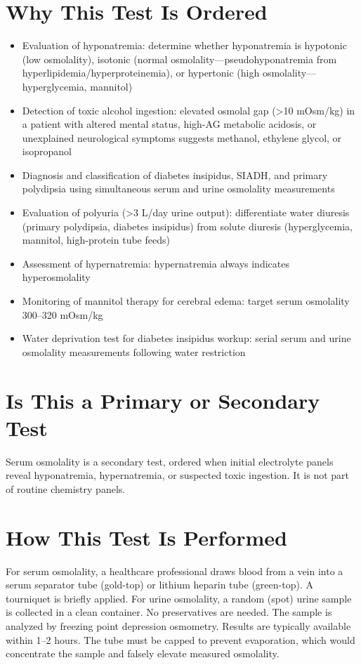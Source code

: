 \section*{Why This Test Is Ordered}
\begin{itemize}
  \item Evaluation of hyponatremia: determine whether hyponatremia is hypotonic (low osmolality), isotonic (normal osmolality---pseudohyponatremia from hyperlipidemia/hyperproteinemia), or hypertonic (high osmolality---hyperglycemia, mannitol)
  \item Detection of toxic alcohol ingestion: elevated osmolal gap (>10 mOsm/kg) in a patient with altered mental status, high-AG metabolic acidosis, or unexplained neurological symptoms suggests methanol, ethylene glycol, or isopropanol
  \item Diagnosis and classification of diabetes insipidus, SIADH, and primary polydipsia using simultaneous serum and urine osmolality measurements
  \item Evaluation of polyuria (>3 L/day urine output): differentiate water diuresis (primary polydipsia, diabetes insipidus) from solute diuresis (hyperglycemia, mannitol, high-protein tube feeds)
  \item Assessment of hypernatremia: hypernatremia always indicates hyperosmolality
  \item Monitoring of mannitol therapy for cerebral edema: target serum osmolality 300--320 mOsm/kg
  \item Water deprivation test for diabetes insipidus workup: serial serum and urine osmolality measurements following water restriction
\end{itemize}

\section*{Is This a Primary or Secondary Test}
Serum osmolality is a secondary test, ordered when initial electrolyte panels reveal hyponatremia, hypernatremia, or suspected toxic ingestion. It is not part of routine chemistry panels.

\section*{How This Test Is Performed}
For serum osmolality, a healthcare professional draws blood from a vein into a serum separator tube (gold-top) or lithium heparin tube (green-top). A tourniquet is briefly applied. For urine osmolality, a random (spot) urine sample is collected in a clean container. No preservatives are needed. The sample is analyzed by freezing point depression osmometry. Results are typically available within 1--2 hours. The tube must be capped to prevent evaporation, which would concentrate the sample and falsely elevate measured osmolality.

